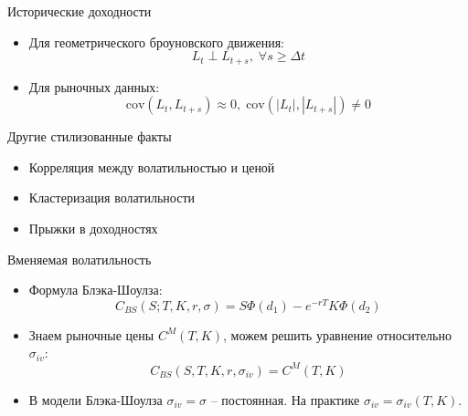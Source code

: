 \documentclass[aspectratio=169]{beamer}
\begin{document}
\begin{frame}{Исторические доходности}
    \begin{itemize}
        \item Для геометрического броуновского движения:
        $$
            L_t \perp L_{t + s}, \; \forall s \geq \Delta t
        $$
        \item Для рыночных данных:
        $$
            \mathrm{cov}(L_t, L_{t+s}) \approx 0, \;
            \mathrm{cov}(|L_t|, |L_{t+s}|) \neq 0
        $$ 
    \end{itemize}

    \centering
\end{frame}

\begin{frame}{Другие стилизованные факты}
    \begin{itemize}
        \item Корреляция между волатильностью и ценой
        \item Кластеризация волатильности
        \item Прыжки в доходностях
    \end{itemize}
\end{frame}

\begin{frame}{Вменяемая волатильность}
    \begin{itemize}
        \item Формула Блэка-Шоулза:
        $$
            C_{BS}(S; T, K, r, \sigma) = S \Phi(d_1) - e^{-rT} K \Phi(d_2)
        $$
        \item Знаем рыночные цены $C^{M}(T, K)$, можем решить уравнение относительно $\sigma_{iv}$:
        $$
            C_{BS}(S, T, K, r, \sigma_{iv}) = C^{M}(T, K)   
        $$
        \item В модели Блэка-Шоулза $\sigma_{iv} = \sigma$ -- постоянная. На практике $\sigma_{iv} = \sigma_{iv}(T, K)$.
    \end{itemize}
\end{frame}
\end{document}

